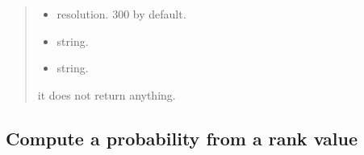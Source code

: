 \documentclass[letterpaper,10pt,english]{sphinxmanual}
\begin{document}
\begin{fulllineitems}
\begin{quote}
\begin{description}
\begin{itemize}
\item {} 
\sphinxAtStartPar
{} \textendash{} resolution. 300 by default.

\item {} 
\sphinxAtStartPar
{} \textendash{} string.

\item {} 
\sphinxAtStartPar
{} \textendash{} string.

\end{itemize}

\sphinxAtStartPar
it does not return anything.

\end{description}\end{quote}

\end{fulllineitems}



\subsection{Compute a probability from a rank value}
\label{\detokenize{usage:compute-a-probability-from-a-rank-value}}
\end{document}

